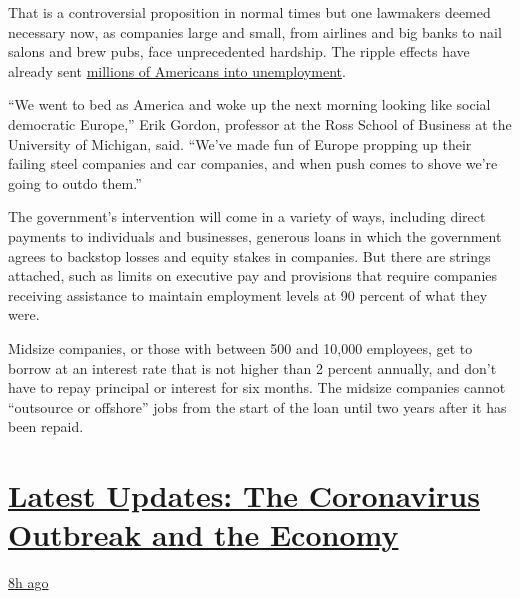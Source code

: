 That is a controversial proposition in normal times but one lawmakers
deemed necessary now, as companies large and small, from airlines and
big banks to nail salons and brew pubs, face unprecedented hardship. The
ripple effects have already sent
\href{https://www.nytimes3xbfgragh.onion/2020/03/26/business/economy/coronavirus-unemployment-claims.html}{millions
of Americans into unemployment}.

``We went to bed as America and woke up the next morning looking like
social democratic Europe,'' Erik Gordon, professor at the Ross School of
Business at the University of Michigan, said. ``We've made fun of Europe
propping up their failing steel companies and car companies, and when
push comes to shove we're going to outdo them.''

The government's intervention will come in a variety of ways, including
direct payments to individuals and businesses, generous loans in which
the government agrees to backstop losses and equity stakes in companies.
But there are strings attached, such as limits on executive pay and
provisions that require companies receiving assistance to maintain
employment levels at 90 percent of what they were.

Midsize companies, or those with between 500 and 10,000 employees, get
to borrow at an interest rate that is not higher than 2 percent
annually, and don't have to repay principal or interest for six months.
The midsize companies cannot ``outsource or offshore'' jobs from the
start of the loan until two years after it has been repaid.

\hypertarget{latest-updates-the-coronavirus-outbreak-and-the-economy}{%
\section{\texorpdfstring{\href{https://www.nytimes3xbfgragh.onion/live/2020/08/17/business/stock-market-today-coronavirus?action=click\&pgtype=Article\&state=default\&region=MAIN_CONTENT_1\&context=storylines_live_updates}{Latest
Updates: The Coronavirus Outbreak and the
Economy}}{Latest Updates: The Coronavirus Outbreak and the Economy}}\label{latest-updates-the-coronavirus-outbreak-and-the-economy}}

\href{https://www.nytimes3xbfgragh.onion/live/2020/08/17/business/stock-market-today-coronavirus?action=click\&pgtype=Article\&state=default\&region=MAIN_CONTENT_1\&context=storylines_live_updates\#robinhood-a-stock-trading-app-is-valued-at-11-2-billion-in-its-latest-funding-round}{8h
ago}

